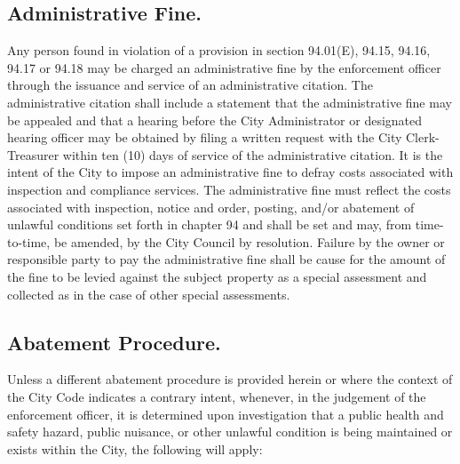 \subsection{Administrative Fine.}
Any person found in violation of a provision in section 94.01(E), 94.15, 94.16, 94.17 or 94.18 may be charged an administrative fine by the enforcement officer through the issuance and service of an administrative citation. The administrative citation shall include a statement that the administrative fine may be appealed and that a hearing before the City Administrator or designated hearing officer may be obtained by filing a written request with the City Clerk-Treasurer within ten (10) days of service of the administrative citation. It is the intent of the City to impose an administrative fine to defray costs associated with inspection and compliance services. The administrative fine must reflect the costs associated with inspection, notice and order, posting, and/or abatement of unlawful conditions set forth in chapter 94 and shall be set and may, from time-to-time, be amended, by the City Council by resolution. Failure by the owner or responsible party to pay the administrative fine shall be cause for the amount of the fine to be levied against the subject property as a special assessment and collected as in the case of other special assessments.
\subsection{Abatement Procedure.}
Unless a different abatement procedure is provided herein or where the context of the City Code indicates a contrary intent, whenever, in the judgement of the enforcement officer, it is determined upon investigation that a public health and safety hazard, public nuisance, or other unlawful condition is being maintained or exists within the City, the following will apply:
